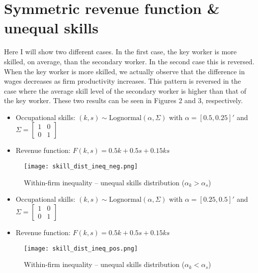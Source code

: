 \documentclass{article}
\begin{document}
	\section*{Symmetric revenue function \& unequal skills}
	Here I will show two different cases. In the first case, the key worker is more skilled, on average, than the secondary worker. In the second case this is reversed. When the key worker is more skilled, we actually observe that the difference in wages decreases as firm productivity increases. This pattern is reversed in the case where the average skill level of the secondary worker is higher than that of the key worker. These two results can be seen in Figures 2 and 3, respectively.
	\newpage
		\begin{itemize}
		\item Occupational skills: $(k,s) \sim \text{Lognormal}(\alpha,\Sigma)$ with $\alpha = [0.5,0.25]'$ and $\Sigma = \begin{bmatrix}
			1 & 0\\
			0 & 1
		\end{bmatrix}$
		\item Revenue function: $F(k,s) = 0.5k + 0.5s + 0.15ks$
	\end{itemize}
	\begin{figure}[H]
	\centering
	\texttt{[image: skill\_dist\_ineq\_neg.png]}
	\caption{Within-firm inequality -- unequal skills distribution ($\alpha_k > \alpha_s$)}
	\end{figure}
		\begin{itemize}
	\item Occupational skills: $(k,s) \sim \text{Lognormal}(\alpha,\Sigma)$ with $\alpha = [0.25,0.5]'$ and $\Sigma = \begin{bmatrix}
		1 & 0\\
		0 & 1
	\end{bmatrix}$
	\item Revenue function: $F(k,s) = 0.5k + 0.5s + 0.15ks$
\end{itemize}
	\begin{figure}[H]
	\centering
	\texttt{[image: skill\_dist\_ineq\_pos.png]}
	\caption{Within-firm inequality -- unequal skills distribution ($\alpha_k < \alpha_s$)}
\end{figure}
	
\end{document}
